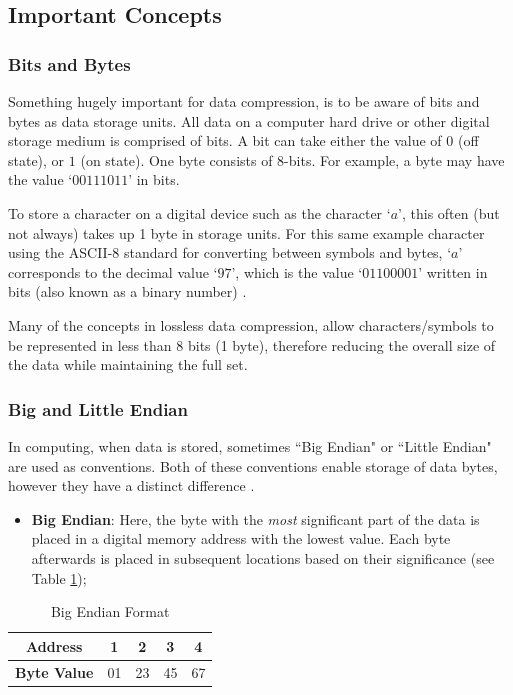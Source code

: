 \documentclass[12pt]{article}
\begin{document}
\subsection{Important Concepts}

\subsubsection{Bits and Bytes}{\label{bits_bytes}}

Something hugely important for data compression, is to be aware of bits and bytes as data storage units. All data on a computer hard drive or other digital storage medium is comprised of bits. A bit can take either the value of $0$ (off state), or $1$ (on state). One byte consists of 8-bits. For example, a byte may have the value `$00111011$' in bits.

To store a character on a digital device such as the character `$a$', this often (but not always) takes up 1 byte in storage units. For this same example character using the ASCII-8 standard for converting between symbols and bytes, `$a$' corresponds to the decimal value `$97$', which is the value `$01100001$' written in bits (also known as a binary number) \citep{computer_fundamentals}.

Many of the concepts in lossless data compression, allow characters/symbols to be represented in less than 8 bits (1 byte), therefore reducing the overall size of the data while maintaining the full set.

\subsubsection{Big and Little Endian}{\label{sec_little_endian}}

In computing, when data is stored, sometimes ``Big Endian" or ``Little Endian" are used as conventions. Both of these conventions enable storage of data bytes, however they have a distinct difference \citep{little_endian}.

\begin{itemize}
	\item \textbf{Big Endian}: Here, the byte with the \emph{most} significant part of the data is placed in a digital memory address with the lowest value. Each byte afterwards is placed in subsequent locations based on their significance (see Table \ref{big_endian});
\end{itemize}
\begin{table}[H]
	\centering
	\begin{tabular}{| c | c | c | c | c |} 
		\hline
		\textbf{Address} & 1 & 2 & 3 & 4\\
		\hline
		\textbf{Byte Value} & 01 & 23 & 45 & 67\\
		\hline
	\end{tabular}
	\caption{Big Endian Format}
	\label{big_endian}
\end{table}
\end{document}

